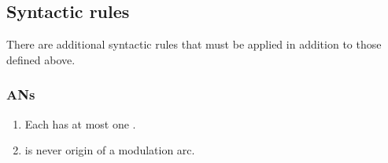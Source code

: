 \subsection{Syntactic rules}

There are additional syntactic rules that must be applied in addition to those defined above.

\subsubsection{ANs}

 \begin{enumerate}
    \item Each  has at most one .
    \item {} is never origin of a modulation arc.
 \end{enumerate}



